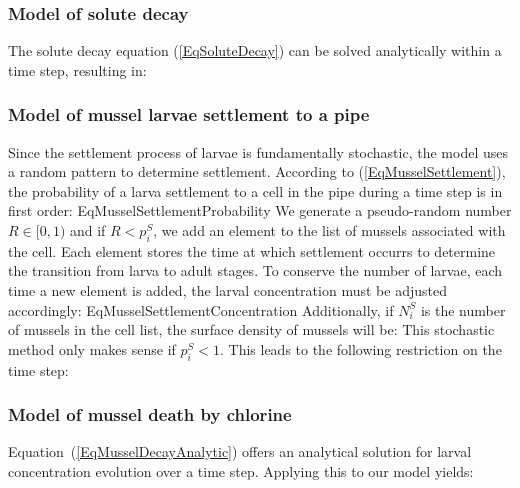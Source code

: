 \documentclass[review,authoryear]{elsarticle}
\begin{document}
\subsubsection{Model of solute decay}

The solute decay equation (\ref{EqSoluteDecay}) can be solved analytically
within a time step, resulting in:

\subsubsection{Model of mussel larvae settlement to a pipe}

Since the settlement process of larvae is fundamentally stochastic, the model
uses a random pattern to determine settlement. According to
(\ref{EqMusselSettlement}), the probability of a larva settlement to a cell in
the pipe during a time step is in first order:
{EqMusselSettlementProbability}
We generate a pseudo-random number $R\in[0,1)$ and if $R<p_i^S$, we add an
element to the list of mussels associated with the cell. Each element stores the
time at which settlement occurrs to determine the transition from larva to adult
stages. To conserve the number of larvae, each time a new element is added, the
larval concentration must be adjusted accordingly:
{EqMusselSettlementConcentration}
Additionally, if $N_i^S$ is the number of mussels in the cell list, the surface
density of mussels will be:
This stochastic method only makes sense if $p_i^S<1$. This leads to the
following restriction on the time step:

\subsubsection{Model of mussel death by chlorine}

Equation~(\ref{EqMusselDecayAnalytic}) offers an analytical solution for larval
concentration evolution over a time step. Applying this to our model yields:
\end{document}
